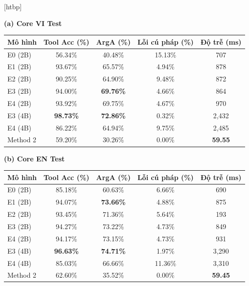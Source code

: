 \documentclass[10pt,twocolumn,a4paper]{article}
\makeatletter
\renewenvironment{table}{\@dblfloat{table}}{\end@dblfloat}
\newcommand{\tabletext}{\small}
\makeatother
\begin{document}
\begin{table}[htbp]
    \centering
    \caption{Kết quả trên Core VI và Core EN (mỗi tập 7,712 mẫu)}
    \label{tab:core-results}
    \tabletext
    \textbf{(a) Core VI Test}\\[2pt]
    \begin{tabular*}{\textwidth}{@{\extracolsep{\fill}}lcccc@{}}
        \toprule
        \textbf{Mô hình} & \textbf{Tool Acc (\%)} & \textbf{ArgA (\%)} & \textbf{Lỗi cú pháp (\%)} & \textbf{Độ trễ (ms)} \\
        \midrule
        E0 (2B) & 56.34\% & 40.48\% & 15.13\% & 707 \\
        E1 (2B) & 93.67\% & 65.57\% & 4.94\% & 878 \\
        E2 (2B) & 90.25\% & 64.90\% & 9.48\% & 872 \\
        E3 (2B) & 94.00\% & \textbf{69.76\%} & 4.66\% & 864 \\
        E4 (2B) & 93.92\% & 69.75\% & 4.67\% & 970 \\
        E3 (4B) & \textbf{98.73\%} & \textbf{72.86\%} & 0.32\% & 2,432 \\
        E4 (4B) & 86.22\% & 64.94\% & 9.75\% & 2,485 \\
        Method 2 & 59.20\% & 30.26\% & 0.00\% & \textbf{59.55} \\
        \bottomrule
    \end{tabular*}
    \par\medskip
    \textbf{(b) Core EN Test}\\[2pt]
    \begin{tabular*}{\textwidth}{@{\extracolsep{\fill}}lcccc@{}}
        \toprule
        \textbf{Mô hình} & \textbf{Tool Acc (\%)} & \textbf{ArgA (\%)} & \textbf{Lỗi cú pháp (\%)} & \textbf{Độ trễ (ms)} \\
        \midrule
        E0 (2B) & 85.18\% & 60.63\% & 6.66\% & 690 \\
        E1 (2B) & 94.07\% & \textbf{73.66\%} & 4.88\% & 875 \\
        E2 (2B) & 93.45\% & 71.36\% & 5.64\% & 193 \\
        E3 (2B) & 94.27\% & 73.22\% & 4.73\% & 849 \\
        E4 (2B) & 94.17\% & 73.15\% & 4.73\% & 931 \\
        E3 (4B) & \textbf{96.63\%} & \textbf{74.71\%} & 1.97\% & 3,290 \\
        E4 (4B) & 85.03\% & 66.66\% & 11.36\% & 3,310 \\
        Method 2 & 62.60\% & 35.52\% & 0.00\% & \textbf{59.45} \\
        \bottomrule
    \end{tabular*}
\end{table}
\end{document}
